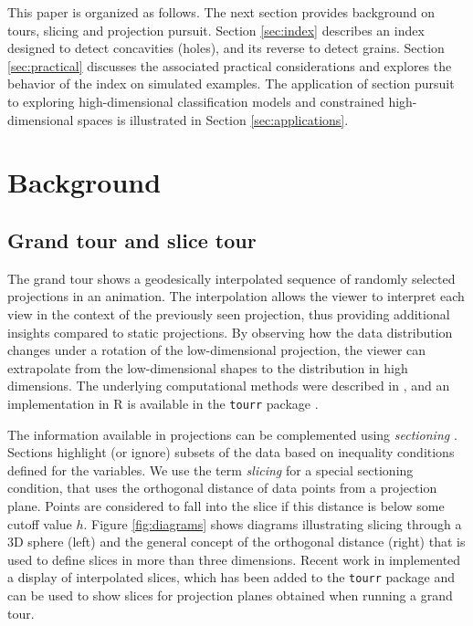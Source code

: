 \documentclass[]{interact}
\theoremstyle{plain}%
\theoremstyle{definition}
\theoremstyle{remark}
\begin{document}
This paper is organized as follows. The next section provides background
on tours, slicing and projection pursuit. Section \ref{sec:index}
describes an index designed to detect concavities (holes), and its
reverse to detect grains. Section \ref{sec:practical} discusses the
associated practical considerations and explores the behavior of the
index on simulated examples. The application of section pursuit to
exploring high-dimensional classification models and constrained
high-dimensional spaces is illustrated in Section
\ref{sec:applications}.

\hypertarget{background}{%
\section{\texorpdfstring{Background
\label{sec:background}}{Background }}\label{background}}

\hypertarget{grand-tour-and-slice-tour}{%
\subsection{Grand tour and slice tour}\label{grand-tour-and-slice-tour}}

The grand tour shows a geodesically interpolated sequence of randomly
selected projections in an animation. The interpolation allows the
viewer to interpret each view in the context of the previously seen
projection, thus providing additional insights compared to static
projections. By observing how the data distribution changes under a
rotation of the low-dimensional projection, the viewer can extrapolate
from the low-dimensional shapes to the distribution in high dimensions.
The underlying computational methods were described in \citet{BCAH05},
and an implementation in R \citep{rlang} is available in the
\texttt{tourr} package \citep{tourr}.

The information available in projections can be complemented using
\textit{sectioning} \citep{prosection}. Sections highlight (or ignore)
subsets of the data based on inequality conditions defined for the
variables. We use the term \textit{slicing} for a special sectioning
condition, that uses the orthogonal distance of data points from a
projection plane. Points are considered to fall into the slice if this
distance is below some cutoff value \(h\). Figure \ref{fig:diagrams}
shows diagrams illustrating slicing through a 3D sphere (left) and the
general concept of the orthogonal distance (right) that is used to
define slices in more than three dimensions. Recent work in
\citet{laa2019slice} implemented a display of interpolated slices, which
has been added to the \texttt{tourr} package and can be used to show
slices for projection planes obtained when running a grand tour.
\end{document}
